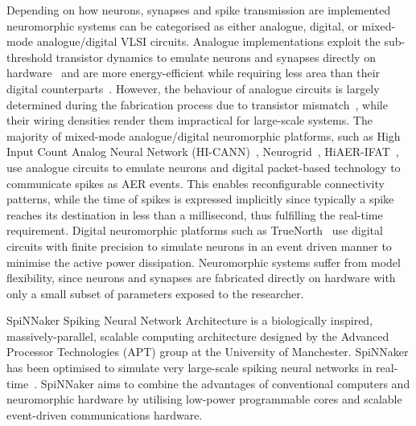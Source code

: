 Depending on how neurons, synapses and spike transmission are implemented neuromorphic systems can be categorised as either analogue, digital, or mixed-mode analogue/digital VLSI circuits. Analogue implementations exploit the sub-threshold transistor dynamics to emulate neurons and synapses directly on hardware~\citep{indiveri2011neuromorphic} and are more energy-efficient while requiring less area than their digital counterparts~\citep{joubert2012hardware}. However, the behaviour of analogue circuits is largely determined during the fabrication process due to transistor mismatch~\citep{indiveri2011neuromorphic,pedram2006thermal,linares2003compact}, while their wiring densities render them impractical for large-scale systems. The majority of mixed-mode analogue/digital neuromorphic platforms, such as High Input Count Analog Neural Network (HI-CANN)~\citep{schemmel2010wafer}, Neurogrid~\citep{benjamin2014neurogrid}, HiAER-IFAT~\citep{yu201265k}, use analogue circuits to emulate neurons and digital packet-based technology to communicate spikes as AER events. This enables reconfigurable connectivity patterns, while the time of spikes is expressed implicitly since typically a spike reaches its destination in less than a millisecond, thus fulfilling the real-time requirement. Digital neuromorphic platforms such as TrueNorth~\citep{merolla2014million} use digital circuits with finite precision to simulate neurons in an event driven manner to minimise the active power dissipation. Neuromorphic systems suffer from model flexibility, since neurons and synapses are fabricated directly on hardware with only a small subset of parameters exposed to the researcher. 

SpiNNaker Spiking Neural Network Architecture is a biologically inspired, massively-parallel, scalable computing architecture designed by the Advanced Processor Technologies (APT) group at the University of Manchester. SpiNNaker has been optimised to simulate very large-scale spiking neural networks in real-time~\citep{furber2014spinnaker}. SpiNNaker aims to combine the advantages of conventional computers and neuromorphic hardware by utilising low-power programmable cores and scalable event-driven communications hardware.

